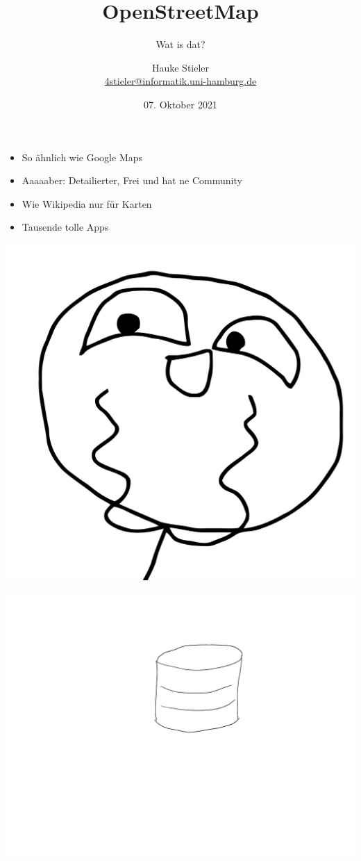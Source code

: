 \documentclass{beamer}
\title{OpenStreetMap}
\subtitle{Wat is dat?}
\author{Hauke Stieler\\\href{mailto:4stieler@informatik.uni-hamburg.de}{4stieler@informatik.uni-hamburg.de}}
\date{07. Oktober 2021}
\begin{document}
	\maketitle
	
	\begin{frame}
		\begin{itemize}
			\item So ähnlich wie Google Maps\pause
			\item Aaaaaber: Detailierter, Frei und hat ne Community\pause
			\item Wie Wikipedia nur für Karten\pause
			\item Tausende tolle Apps
		\end{itemize}
	\end{frame}

	\begin{frame}
		\begin{center}
			\includegraphics[width=0.5\linewidth]{images/happy-meme}
		\end{center}
	\end{frame}
	
	\begin{frame}
		\begin{center}
			\includegraphics[width=\linewidth]{images/database-1}
		\end{center}
	\end{frame}
\end{document}
